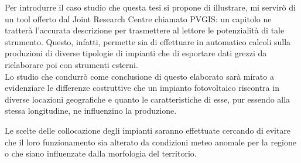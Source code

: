 Per introdurre il caso studio che questa tesi si propone di illustrare, mi servirò di un tool offerto dal Joint Research Centre chiamato PVGIS: un capitolo ne tratterà l'accurata descrizione per trasmettere al lettore le potenzialità di tale strumento.
Questo, infatti, permette sia di effettuare in automatico calcoli sulla produzioni di diverse tipologie di impianti che di esportare dati grezzi da rielaborare poi con strumenti esterni.\\
Lo studio che condurrò come conclusione di questo elaborato sarà mirato a evidenziare le differenze costruttive che un impianto fotovoltaico riscontra in diverse locazioni geografiche e quanto le caratteristiche di esse, pur essendo alla stessa longitudine, ne influenzino la produzione.
\par
Le scelte delle collocazione degli impianti saranno effettuate cercando di evitare che il loro funzionamento sia alterato da condizioni meteo anomale per la regione o che siano influenzate dalla morfologia del territorio.